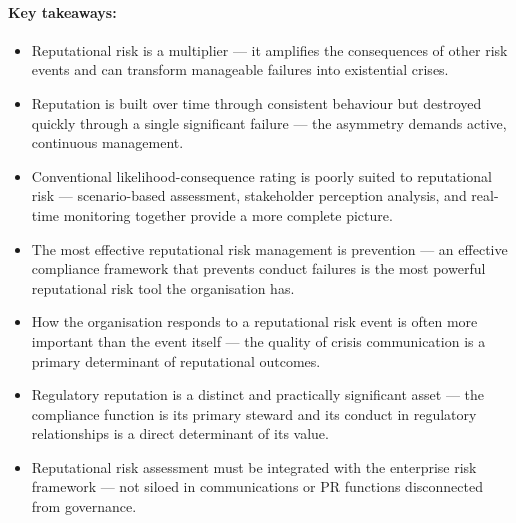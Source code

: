 \paragraph{Key takeaways:}
\begin{itemize}
  \item{Reputational risk is a multiplier — it amplifies the consequences of other risk events and can transform manageable failures into existential crises.}
  \item{Reputation is built over time through consistent behaviour but destroyed quickly through a single significant failure — the asymmetry demands active, continuous management.}
  \item{Conventional likelihood-consequence rating is poorly suited to reputational risk — scenario-based assessment, stakeholder perception analysis, and real-time monitoring together provide a more complete picture.}
  \item{The most effective reputational risk management is prevention — an effective compliance framework that prevents conduct failures is the most powerful reputational risk tool the organisation has.}
  \item{How the organisation responds to a reputational risk event is often more important than the event itself — the quality of crisis communication is a primary determinant of reputational outcomes.}
  \item{Regulatory reputation is a distinct and practically significant asset — the compliance function is its primary steward and its conduct in regulatory relationships is a direct determinant of its value.}
  \item{Reputational risk assessment must be integrated with the enterprise risk framework — not siloed in communications or PR functions disconnected from governance.}
\end{itemize}

